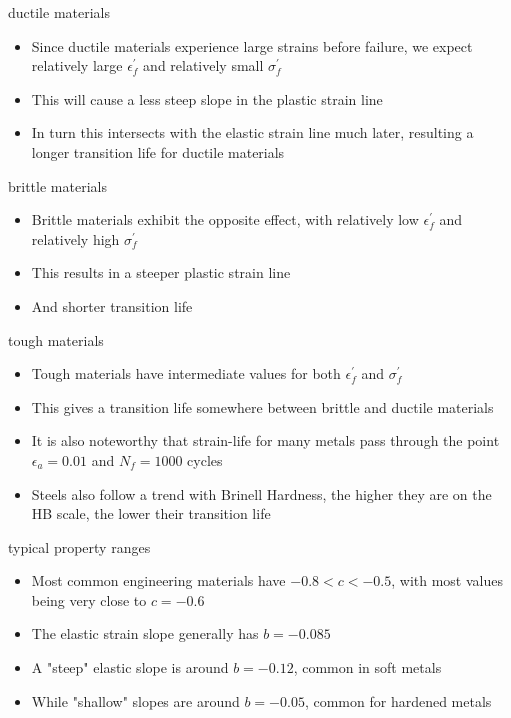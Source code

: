 \documentclass[10pt]{beamer}
\begin{document}
\begin{frame}{ductile materials}
	\begin{itemize}[<+->]
		\item Since ductile materials experience large strains before failure, we expect relatively large $\epsilon_f^\prime$ and relatively small $\sigma_f^\prime$
		\item This will cause a less steep slope in the plastic strain line
		\item In turn this intersects with the elastic strain line much later, resulting a longer transition life for ductile materials
	\end{itemize}
\end{frame}

\begin{frame}{brittle materials}
	\begin{itemize}[<+->]
		\item Brittle materials exhibit the opposite effect, with relatively low $\epsilon_f^\prime$ and relatively high $\sigma_f^\prime$
		\item This results in a steeper plastic strain line
		\item And shorter transition life 
	\end{itemize}
\end{frame}

\begin{frame}{tough materials}
	\begin{itemize}[<+->]
		\item Tough materials have intermediate values for both $\epsilon_f^\prime$ and $\sigma_f^\prime$
		\item This gives a transition life somewhere between brittle and ductile materials
		\item It is also noteworthy that strain-life for many metals pass through the point $\epsilon_a = 0.01$ and $N_f = 1000$ cycles
		\item Steels also follow a trend with Brinell Hardness, the higher they are on the HB scale, the lower their transition life
	\end{itemize}
\end{frame}

\begin{frame}{typical property ranges}
	\begin{itemize}[<+->]
		\item Most common engineering materials have $-0.8 < c < -0.5$, with most values being very close to $c=-0.6$
		\item The elastic strain slope generally has $b=-0.085$
		\item A "steep" elastic slope is around $b=-0.12$, common in soft metals
		\item While "shallow" slopes are around $b=-0.05$, common for hardened metals
	\end{itemize}
\end{frame}
\end{document}
